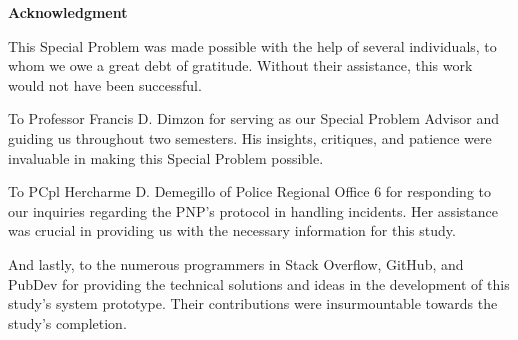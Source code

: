 \doublespacing
\begin{center}
	\textbf{Acknowledgment}
\end{center}

This Special Problem was made possible with the help of several individuals, to whom we owe a great debt of gratitude. Without their assistance, this work would not have been successful.

To Professor Francis D. Dimzon for serving as our Special Problem Advisor and guiding us throughout two semesters. His insights, critiques, and patience were invaluable in making this Special Problem possible.

To PCpl Hercharme D. Demegillo of Police Regional Office 6 for responding to our inquiries regarding the PNP's protocol in handling incidents. Her assistance was crucial in providing us with the necessary information for this study.

And lastly, to the numerous programmers in Stack Overflow, GitHub, and PubDev for providing the technical solutions and ideas in the development of this study's system prototype. Their contributions were insurmountable towards the study's completion.